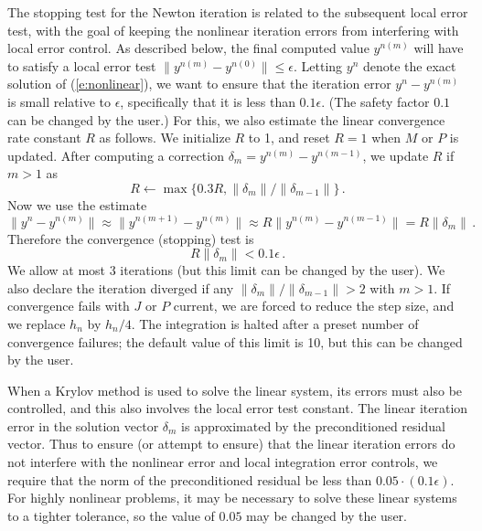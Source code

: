 The stopping test for the Newton iteration is related to the
subsequent local error test, with the goal of keeping the nonlinear
iteration errors from interfering with local error control.  As
described below, the final computed value $y^{n(m)}$ will have to
satisfy a local error test $\|y^{n(m)} - y^{n(0)}\| \leq \epsilon$.
Letting $y^n$ denote the exact solution of (\ref{e:nonlinear}), we want
to ensure that the iteration error $y^n - y^{n(m)}$ is small relative
to $\epsilon$, specifically that it is less than $0.1 \epsilon$.
(The safety factor $0.1$ can be changed by the user.)  For this, we
also estimate the linear convergence rate constant $R$ as follows.
We initialize $R$ to 1, and reset $R = 1$ when $M$ or $P$ is updated.
After computing a correction $\delta_m = y^{n(m)}-y^{n(m-1)}$, we
update $R$ if $m > 1$ as
\begin{equation*}
  R \leftarrow \max\{0.3R , \|\delta_m\| / \|\delta_{m-1}\| \} \, . 
\end{equation*}
Now we use the estimate
\begin{equation*}
  \| y^n - y^{n(m)} \| \approx \| y^{n(m+1)} - y^{n(m)} \| 
  \approx R \| y^{n(m)} - y^{n(m-1)} \|  =  R \|\delta_m \| \, . 
\end{equation*}
Therefore the convergence (stopping) test is 
\begin{equation*}
  R \|\delta_m \| < 0.1 \epsilon \, .
\end{equation*}
We allow at most 3 iterations (but this limit can be changed by the
user).  We also declare the iteration diverged if any $\|\delta_m\| /
\|\delta_{m-1}\| > 2$ with $m > 1$. If convergence fails with $J$ or
$P$ current, we are forced to reduce the step size, and we replace
$h_n$ by $h_n/4$.  The integration is halted after a preset number
of convergence failures; the default value of this limit is 10, 
but this can be changed by the user.

When a Krylov method is used to solve the linear system, its errors must also be
controlled, and this also involves the local error test constant.  The
linear iteration error in the solution vector $\delta_m$ is
approximated by the preconditioned residual vector.  Thus to ensure
(or attempt to ensure) that the linear iteration errors do not
interfere with the nonlinear error and local integration error
controls, we require that the norm of the preconditioned residual
be less than $0.05 \cdot (0.1 \epsilon)$.  For highly nonlinear
problems, it may be necessary to solve these linear systems to a
tighter tolerance, so the value of $0.05$ may be changed by the user.

